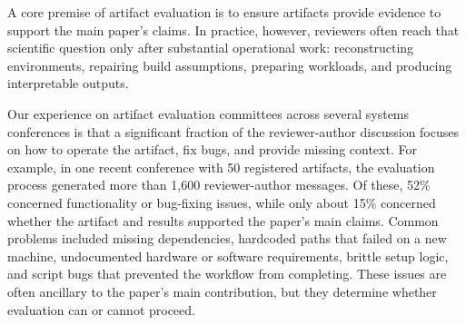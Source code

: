 
A core premise of artifact evaluation is to ensure artifacts provide evidence to support the main paper's claims. In practice, however, reviewers often reach that scientific question only after substantial operational work: reconstructing environments, repairing build assumptions, preparing workloads, and producing interpretable outputs.

Our experience on artifact evaluation committees across several systems conferences is that a significant fraction of the reviewer-author discussion focuses on how to operate the artifact, fix bugs, and provide missing context. For example, in one recent conference with 50 registered artifacts, the evaluation process generated more than 1,600 reviewer-author messages. Of these, 52\% concerned functionality or bug-fixing issues, while only about 15\% concerned whether the artifact and results supported the paper's main claims. Common problems included missing dependencies, hardcoded paths that failed on a new machine, undocumented hardware or software requirements, brittle setup logic, and script bugs that prevented the workflow from completing. These issues are often ancillary to the paper's main contribution, but they determine whether evaluation can or cannot proceed.

